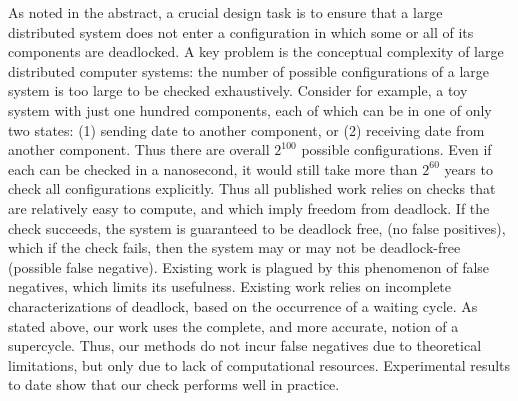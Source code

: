 As noted in the abstract, a crucial design task is to ensure that a large distributed system does not enter a configuration in which some or all of
its components are deadlocked. 
A key problem is the conceptual complexity of large distributed computer systems: the number of possible configurations of a large system is 
too large to be checked exhaustively. Consider for example, a toy system with just one hundred components, each of which can be in
one of only two states: (1) sending date to another component, or (2) receiving date from another component. Thus there are overall $2^{100}$ possible
configurations. Even if each can be checked in a nanosecond, it would still take more than $2^{60}$ years to check all configurations explicitly.
%
Thus all published work relies on checks that are 
relatively easy to compute, and which imply freedom from deadlock. If the check succeeds, the system is guaranteed to be deadlock free, (no false
positives), which if the check fails, then the system may or may not be deadlock-free (possible false negative).  Existing work is plagued by this
phenomenon of false negatives, which limits its usefulness.
%
Existing work relies on incomplete characterizations of deadlock, based on the occurrence of a waiting cycle. 
As stated above, our work uses the complete, and more accurate, notion of a supercycle. Thus, our methods do not incur false negatives due to 
theoretical limitations, but only due to lack of computational resources. Experimental results to date show that our check performs well in practice.



%









